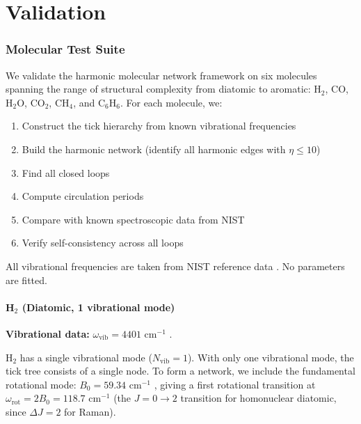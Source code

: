 \documentclass[11pt,twocolumn,a4paper]{article}
\theoremstyle{definition}
\theoremstyle{remark}
\begin{document}

\part{Validation}

\section{Molecular Test Suite}
\label{sec:validation}

We validate the harmonic molecular network framework on six molecules spanning the range of structural complexity from diatomic to aromatic: H$_2$, CO, H$_2$O, CO$_2$, CH$_4$, and C$_6$H$_6$. For each molecule, we:
\begin{enumerate}[nosep]
\item Construct the tick hierarchy from known vibrational frequencies
\item Build the harmonic network (identify all harmonic edges with $\eta \leq 10$)
\item Find all closed loops
\item Compute circulation periods
\item Compare with known spectroscopic data from NIST \citep{nist_webbook, shimanouchi1972}
\item Verify self-consistency across all loops
\end{enumerate}

All vibrational frequencies are taken from NIST reference data \citep{shimanouchi1972, nist_webbook, huber1979, irikura2007}. No parameters are fitted.

\subsection{H$_2$ (Diatomic, 1 vibrational mode)}

\textbf{Vibrational data:} $\omega_{\mathrm{vib}} = 4401$ cm$^{-1}$ \citep{huber1979}.

H$_2$ has a single vibrational mode ($N_{\mathrm{vib}} = 1$). With only one vibrational mode, the tick tree consists of a single node. To form a network, we include the fundamental rotational mode: $B_0 = 59.34$ cm$^{-1}$ \citep{huber1979}, giving a first rotational transition at $\omega_{\mathrm{rot}} = 2B_0 = 118.7$ cm$^{-1}$ (the $J = 0 \to 2$ transition for homonuclear diatomic, since $\Delta J = 2$ for Raman).
\end{document}
